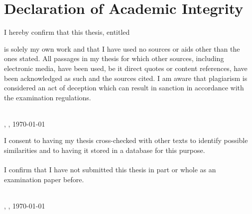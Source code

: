 \chapter*{Declaration of Academic Integrity}
I hereby confirm that this thesis, entitled 

\begin{center}
	\textit{\printtitle}
\end{center}

is solely my own work and that I have used no sources or aids other than the ones stated. All passages in my thesis for which other sources, including electronic media, have been used, be it direct quotes or content references, have been acknowledged as such and the sources cited. I am aware that plagiarism is considered an act of deception which can result in sanction in accordance with the examination regulations.

\vspace{0.75cm}
\parbox{17em}{\hrulefill} \\
\printname, \printcity, \today
\vspace{0.75cm}

I consent to having my thesis cross-checked with other texts to identify possible similarities and to having it stored in a database for this purpose.
\\
\\
I confirm that I have not submitted this thesis in part or whole as an examination paper before.

\vspace{0.75cm}
\parbox{17em}{\hrulefill} \\
\printname, \printcity, \today

